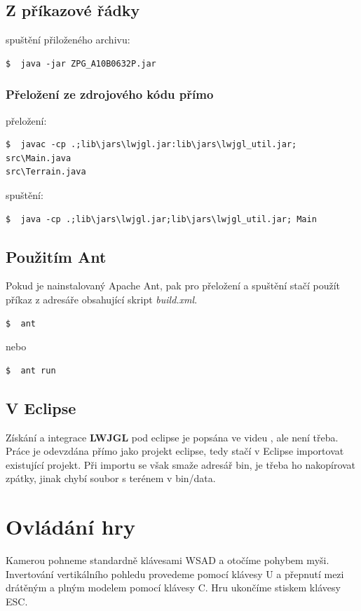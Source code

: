 \documentclass[11pt]{article}
\begin{document}
\subsection{Z příkazové řádky}
spuštění přiloženého archivu:
\begin{verbatim}
$  java -jar ZPG_A10B0632P.jar
\end{verbatim}

\subsubsection{Přeložení ze zdrojového kódu přímo}
přeložení:
\begin{verbatim}
$  javac -cp .;lib\jars\lwjgl.jar:lib\jars\lwjgl_util.jar; src\Main.java
src\Terrain.java
\end{verbatim}
spuštění:
\begin{verbatim}
$  java -cp .;lib\jars\lwjgl.jar;lib\jars\lwjgl_util.jar; Main
\end{verbatim}


\subsection{Použitím Ant}
Pokud je nainstalovaný Apache Ant, pak pro přeložení a spuštění stačí použít příkaz z adresáře obsahující skript \textit{build.xml}.
\begin{verbatim}
$  ant
\end{verbatim}
nebo 
\begin{verbatim}
$  ant run
\end{verbatim}

\subsection{V Eclipse}
Získání a integrace \textbf {LWJGL} pod eclipse je popsána ve videu
\cite{installtut}, ale není třeba. Práce je odevzdána přímo jako projekt
eclipse, tedy stačí v Eclipse importovat existující projekt. Při importu se
však smaže adresář bin, je třeba ho nakopírovat zpátky, jinak chybí soubor s
terénem v bin/data.


\section{Ovládání hry}
Kamerou pohneme standardně klávesami WSAD a otočíme pohybem myši. Invertování
vertikálního pohledu provedeme pomocí klávesy U a přepnutí mezi drátěným a
plným modelem pomocí klávesy C. Hru ukončíme stiskem klávesy ESC.
\end{document}
